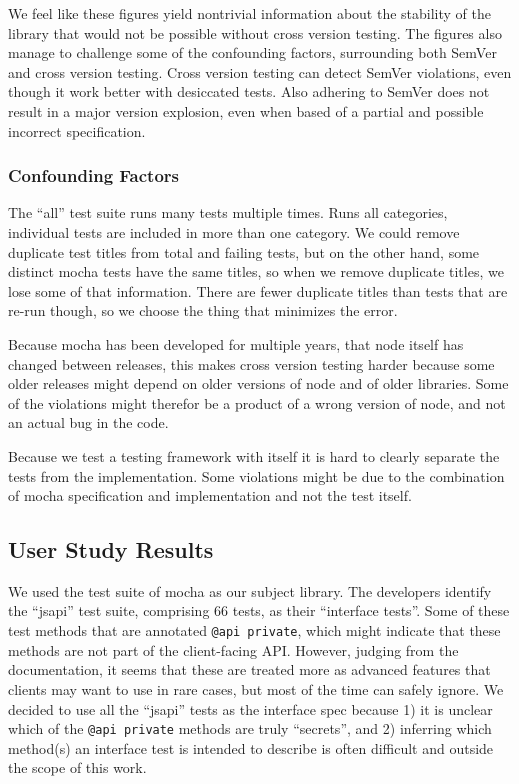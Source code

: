 We feel like these figures yield nontrivial information about the stability
of the library that would not be possible without cross version testing. The
figures also manage to challenge some of the confounding factors, surrounding
both SemVer and cross version testing. Cross version testing can detect SemVer
violations, even though it work better with desiccated tests. Also adhering to
SemVer does not result in a major version explosion, even when based of a 
partial and possible incorrect specification.

\subsubsection{Confounding Factors}

The ``all'' test suite runs many tests multiple times. Runs all categories,
individual tests are included in more than one category. We could remove
duplicate test titles from total and failing tests, but on the other
hand, some distinct mocha tests have the same titles, so when we remove
duplicate titles, we lose some of that information. There are fewer
duplicate titles than tests that are re-run though, so we choose the
thing that minimizes the error.

Because mocha has been developed for multiple years, that node itself
has changed between releases, this makes cross version testing harder
because some older releases might depend on older versions of node and
of older libraries. Some of the violations might therefor be a product
of a wrong version of node, and not an actual bug in the code. 

Because we test a testing framework with itself it is hard to clearly
separate the tests from the implementation. Some violations might be 
due to the combination of mocha specification and implementation and not
the test itself.

\subsection{User Study Results}
We used the test suite of mocha as our subject library. The developers
identify the ``jsapi'' test suite, comprising 66 tests, as their
``interface tests''. Some of these test methods that are annotated
{\tt @api private}, which might indicate that these methods are not
part of the client-facing API\@. However, judging from the
documentation, it seems that these are treated more as advanced
features that clients may want to use in rare cases, but most of the
time can safely ignore. We decided to use all the ``jsapi'' tests as the
interface spec because 1) it is unclear which of the {\tt @api
  private} methods are truly ``secrets'', and 2) inferring which
method(s) an interface test is intended to describe is often difficult and
outside the scope of this work.

